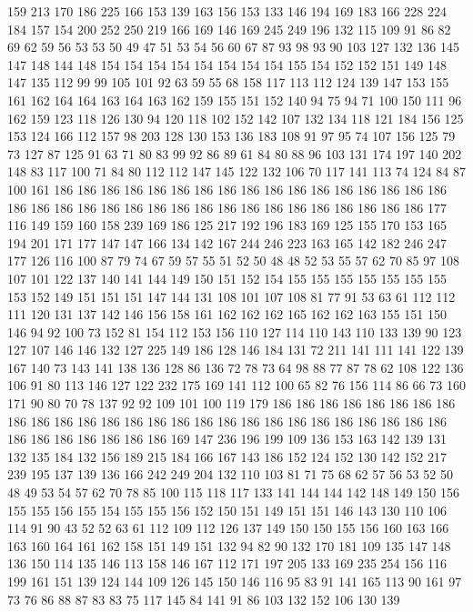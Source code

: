159 213 170 186 225 166 153 139 163 156 153 133 146 194 169 183 166 228 224 184
157 154 200 252 250 219 166 169 146 169 245 249 196 132 115 109 91 86 82 69
62 59 56 53 53 50 49 47 51 53 54 56 60 67 87 93 98 93 90 103
127 132 136 145 147 148 144 148 154 154 154 154 154 154 154 154 155 154 152 152
151 149 148 147 135 112 99 99 105 101 92 63 59 55 68 158 117 113 112 124
139 147 153 155 161 162 164 164 163 164 163 162 159 155 151 152 140 94 75 94
71 100 150 111 96 162 159 123 118 126 130 94 120 118 102 152 142 107 132 134
118 121 184 156 125 153 124 166 112 157 98 203 128 130 153 136 183 108 91 97
95 74 107 156 125 79 73 127 87 125 91 63 71 80 83 99 92 86 89 61
84 80 88 96 103 131 174 197 140 202 148 83 117 100 71 84 80 112 112 147
145 122 132 106 70 117 141 113 74 124 84 87 100 161 186 186 186 186 186 186
186 186 186 186 186 186 186 186 186 186 186 186 186 186 186 186 186 186 186 186
186 186 186 186 186 186 186 186 186 177 116 149 159 160 158 239 169 186 125 217
192 196 183 169 125 155 170 153 165 194 201 171 177 147 147 166 134 142 167 244
246 223 163 165 142 182 246 247 177 126 116 100 87 79 74 67 59 57 55 51
52 50 48 48 52 53 55 57 62 70 85 97 108 107 101 122 137 140 141 144
149 150 151 152 154 155 155 155 155 155 155 155 153 152 149 151 151 151 147 144
131 108 101 107 108 81 77 91 53 63 61 112 112 111 120 131 137 142 146 156
158 161 162 162 162 165 162 162 163 155 151 150 146 94 92 100 73 152 81 154
112 153 156 110 127 114 110 143 110 133 139 90 123 127 107 146 146 132 127 225
149 186 128 146 184 131 72 211 141 111 141 122 139 167 140 73 143 141 138 136
128 86 136 72 78 73 64 98 88 77 87 78 62 108 122 136 106 91 80 113
146 127 122 232 175 169 141 112 100 65 82 76 156 114 86 66 73 160 171 90
80 70 78 137 92 92 109 101 100 119 179 186 186 186 186 186 186 186 186 186
186 186 186 186 186 186 186 186 186 186 186 186 186 186 186 186 186 186 186 186
186 186 186 186 186 169 147 236 196 199 109 136 153 163 142 139 131 132 135 184
132 156 189 215 184 166 167 143 186 152 124 152 130 142 152 217 239 195 137 139
136 166 242 249 204 132 110 103 81 71 75 68 62 57 56 53 52 50 48 49
53 54 57 62 70 78 85 100 115 118 117 133 141 144 144 142 148 149 150 156
155 155 156 155 154 155 155 156 152 150 151 149 151 151 146 143 130 110 106 114
91 90 43 52 52 63 61 112 109 112 126 137 149 150 150 155 156 160 163 166
163 160 164 161 162 158 151 149 151 132 94 82 90 132 170 181 109 135 147 148
136 150 114 135 146 113 158 146 167 112 171 197 205 133 169 235 254 156 116 199
161 151 139 124 144 109 126 145 150 146 116 95 83 91 141 165 113 90 161 97
73 76 86 88 87 83 83 75 117 145 84 141 91 86 103 132 152 106 130 139
